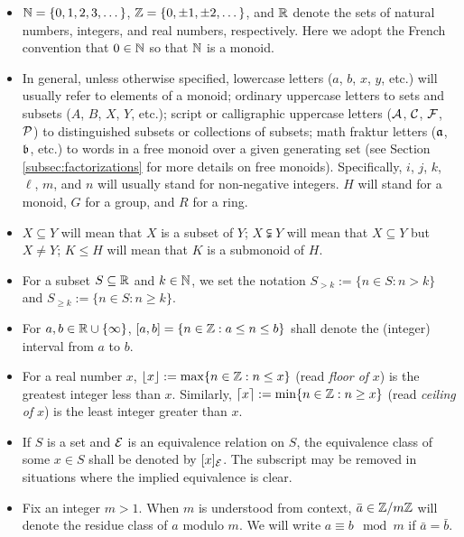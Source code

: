 \begin{itemize}
	\item $\NN = \{0,1,2,3,\dots\}$, $\ZZ = \{0,\pm 1, \pm 2,\dots\}$, and $\RR$ denote the sets of natural numbers, integers, and real numbers, respectively.
	Here we adopt the French convention that $0\in \NN$ so that $\NN$ is a monoid.
	
	\item In general, unless otherwise specified, lowercase letters ($a$, $b$, $x$, $y$, etc.) will usually refer to elements of a monoid; 
	ordinary uppercase letters to sets and subsets ($A$, $B$, $X$, $Y$, etc.); 
	script or calligraphic uppercase letters ($\A$, $\C$, $\F$, $\P$) to distinguished subsets or collections of subsets; 
	math fraktur letters ($\aa$, $\bb$, etc.) to words in a free monoid over a given generating set 
	(see Section \ref{subsec:factorizations} for more details on free monoids).
	Specifically, $i$, $j$, $k$, $\ell$, $m$, and $n$ will usually stand for non-negative integers. 
	$H$ will stand for a monoid, $G$ for a group, and $R$ for a ring.
	
	\item $X\subseteq Y$ will mean that $X$ is a subset of $Y$; $X\subsetneqq Y$ will mean that $X\subseteq Y$ but $X\neq Y$; $K\le H$ will mean that $K$ is a submonoid of $H$.
	
	\item For a subset $S\subseteq \RR$ and $k\in \NN$, we set the notation $S_{>k} := \{n\in S: n>k\}$ and $S_{\ge k} := \{n\in S: n\ge k\}$.
	
	\item For $a, b\in \RR\cup\{\infty\}$, $[ a,b ] = \{ n\in \ZZ : a \le n \le b \}$ shall denote the (integer) interval from $a$ to $b$.
	
	\item For a real number $x$, $\lfloor x \rfloor := \max\{n\in \ZZ: n \le x\}$ (read \textit{floor of} $x$) is the greatest integer less than $x$.
	Similarly, $\lceil x \rceil := \min\{n\in \ZZ: n\ge x\}$ (read \textit{ceiling of} $x$) is the least integer greater than $x$.
	
	\item If $S$ is a set and $\E$ is an equivalence relation on $S$, the equivalence class of some $x\in S$ shall be denoted by $[x]_\E$.
	The subscript may be removed in situations where the implied equivalence is clear.
	
	\item Fix an integer $m>1$.  When $m$ is understood from context, $\bar{a} \in \ZZ/m\ZZ$ will denote the residue class of $a$ modulo $m$.
	We will write $a\equiv b \mod m$ if $\bar{a} = \bar{b}$.
	

\end{itemize}
